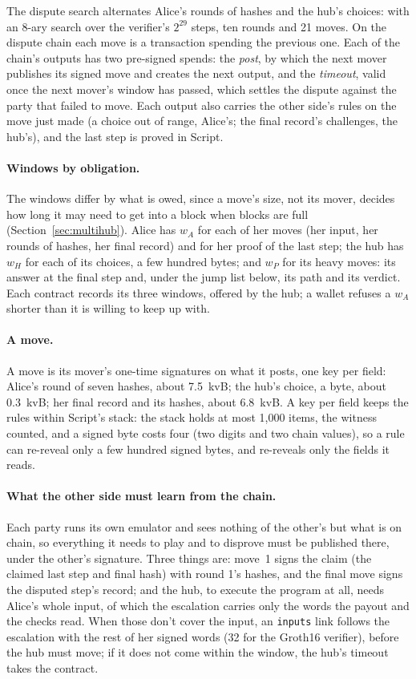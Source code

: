 \documentclass[11pt]{article}
\newcommand{\tx}[1]{\texttt{#1}}
\begin{document}
The dispute search alternates Alice's rounds of hashes and the hub's choices:
with an 8-ary search over the verifier's $2^{29}$ steps, ten rounds and
21 moves. On the dispute chain each move is a transaction spending the previous
one. Each of the chain's outputs has two pre-signed spends: the
\emph{post}, by which the next mover publishes its signed move and
creates the next output, and the \emph{timeout}, valid once the next
mover's window has passed, which settles the dispute against the party
that failed to move. Each
output also carries the other side's rules on the move just made (a
choice out of range, Alice's; the final record's challenges, the hub's),
and the last step is proved in Script.

\paragraph{Windows by obligation.} The windows differ by what is owed,
since a move's size, not its mover, decides how long it may need to get
into a block when blocks are full (Section~\ref{sec:multihub}). Alice
has $w_A$ for each of her moves (her input, her rounds of hashes, her
final record) and for her proof of the last step; the hub has $w_H$ for
each of its choices, a few hundred bytes; and $w_P$ for its heavy moves:
its answer at the final step and, under the jump list below, its path
and its verdict. Each contract records its three windows, offered by the
hub; a wallet refuses a $w_A$ shorter than it is willing to keep up
with.

\paragraph{A move.} A move is its mover's one-time signatures on what it
posts, one key per field: Alice's round of seven hashes, about 7.5~kvB;
the hub's choice, a byte, about 0.3~kvB; her final record and its hashes,
about 6.8~kvB. A key per field keeps the rules within Script's stack:
the stack holds at most 1,000 items, the witness counted, and a signed
byte costs four (two digits and two chain values), so a rule can
re-reveal only a few hundred signed bytes, and re-reveals only the fields
it reads.

\paragraph{What the other side must learn from the chain.} Each party
runs its own emulator and sees nothing of the other's but what is on
chain, so everything it needs to play and to disprove must be published
there, under the other's signature. Three things are: move~1 signs the
claim (the claimed last step and final hash) with round 1's hashes, and
the final move signs the disputed step's record; and the hub, to execute
the program at all, needs Alice's whole input, of which the escalation
carries only the words the payout and the checks read. When those don't
cover the input, an \tx{inputs} link follows the escalation with the
rest of her signed words (32 for the Groth16 verifier), before the hub
must move; if it does not come within the window, the hub's timeout
takes the contract.
\end{document}
